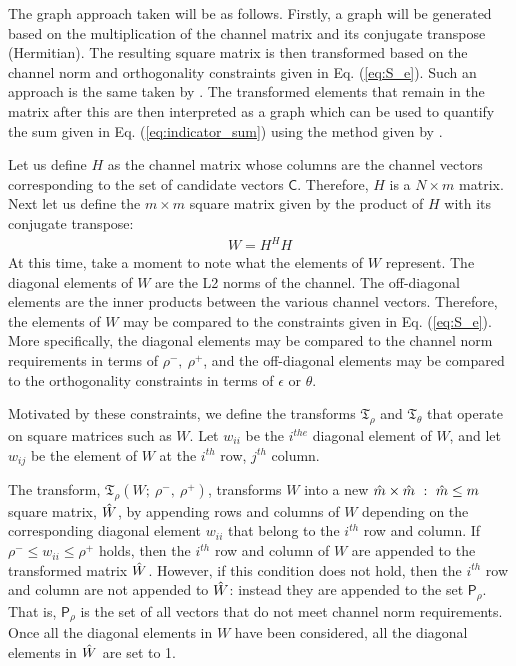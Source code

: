 The graph approach taken will be as follows. Firstly, a graph will be generated based on the multiplication of the channel matrix and its conjugate transpose (Hermitian). The resulting square matrix is then transformed based on the channel norm and orthogonality constraints given in Eq. (\ref{eq:S_e}). Such an approach is the same taken by \cite{SwannackThesis}. The transformed elements that remain in the matrix after this are then interpreted as a graph which can be used to quantify the sum given in Eq. (\ref{eq:indicator_sum}) using the method given by \cite{Janson2004}.

Let us define $H$ as the channel matrix whose columns are the channel vectors corresponding to the set of candidate vectors $\mathsf{C}$. Therefore, $H$ is a $N \times m$ matrix. Next let us define the $m \times m$ square matrix given by the product of $H$ with its conjugate transpose:
 \begin{equation}\label{eq:w_matrix}
    \begin{aligned}
        W = H^HH
    \end{aligned}
\end{equation}
At this time, take a moment to note what the elements of $W$ represent. The diagonal elements of $W$ are the L2 norms of the channel. The off-diagonal elements are the inner products between the various channel vectors. Therefore, the elements of $W$ may be compared to the constraints given in Eq. (\ref{eq:S_e}). More specifically, the diagonal elements may be compared to the channel norm requirements in terms of $\rho^-,\ \rho^+$, and the off-diagonal elements may be compared to the orthogonality constraints in terms of $\epsilon$ or $\theta$.

Motivated by these constraints, we define the transforms $\mathfrak{T}_\rho$ and $\mathfrak{T}_\theta$ that operate on square matrices such as $W$. Let $w_{ii}$ be the $i^{the}$ diagonal element of $W$, and let $w_{ij}$ be the element of $W$ at the $i^{th}$ row, $j^{th}$ column.

The transform, $\mathfrak{T}_\rho(W;\ \rho^-, \ \rho^+)$, transforms $W$ into a new $\Hat{m}\times \Hat{m}\ : \ \Hat{m}\leq m$ square matrix, $\Hat{W}$, by appending rows and columns of $W$ depending on the corresponding diagonal element $w_{ii}$ that belong to the $i^{th}$ row and column. If $\rho^- \leq w_{ii}\leq \rho^+$ holds, then the $i^{th}$ row and column of $W$ are appended to the transformed matrix $\Hat{W}$. However, if this condition does not hold, then the $i^{th}$ row and column are not appended to $\Hat{W}$: instead they are appended to the set $\mathsf{P}_\rho$. That is, $\mathsf{P}_\rho$ is the set of all vectors that do not meet channel norm requirements. Once all the diagonal elements in $W$ have been considered, all the diagonal elements in $\Hat{W}$ are set to 1.

